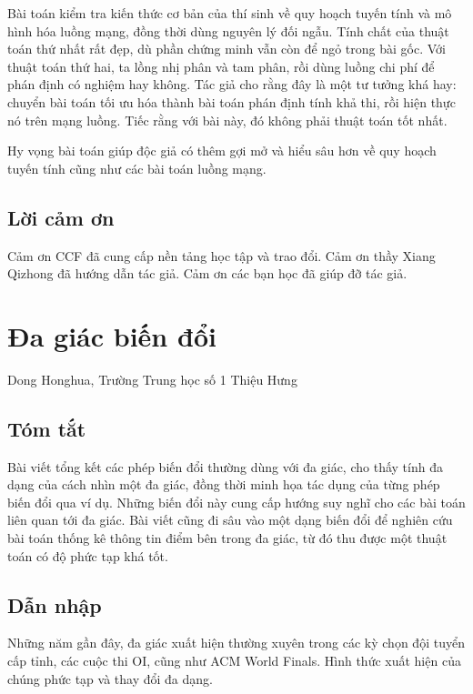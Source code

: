 \documentclass[11pt]{article}
\begin{document}
Bài toán kiểm tra kiến thức cơ bản của thí sinh về quy hoạch tuyến tính và mô
hình hóa luồng mạng, đồng thời dùng nguyên lý đối ngẫu. Tính chất của thuật
toán thứ nhất rất đẹp, dù phần chứng minh vẫn còn để ngỏ trong bài gốc. Với
thuật toán thứ hai, ta lồng nhị phân và tam phân, rồi dùng luồng chi phí để phán
định có nghiệm hay không. Tác giả cho rằng đây là một tư tưởng khá hay: chuyển
bài toán tối ưu hóa thành bài toán phán định tính khả thi, rồi hiện thực nó trên
mạng luồng. Tiếc rằng với bài này, đó không phải thuật toán tốt nhất.

Hy vọng bài toán giúp độc giả có thêm gợi mở và hiểu sâu hơn về quy hoạch tuyến
tính cũng như các bài toán luồng mạng.

\subsection{Lời cảm ơn}

Cảm ơn CCF đã cung cấp nền tảng học tập và trao đổi. Cảm ơn thầy Xiang Qizhong
đã hướng dẫn tác giả. Cảm ơn các bạn học đã giúp đỡ tác giả.

\section{Đa giác biến đổi}

\begin{center}
Dong Honghua, Trường Trung học số 1 Thiệu Hưng
\end{center}

\subsection*{Tóm tắt}

Bài viết tổng kết các phép biến đổi thường dùng với đa giác, cho thấy tính đa
dạng của cách nhìn một đa giác, đồng thời minh họa tác dụng của từng phép biến
đổi qua ví dụ. Những biến đổi này cung cấp hướng suy nghĩ cho các bài toán liên
quan tới đa giác. Bài viết cũng đi sâu vào một dạng biến đổi để nghiên cứu bài
toán thống kê thông tin điểm bên trong đa giác, từ đó thu được một thuật toán
có độ phức tạp khá tốt.

\subsection{Dẫn nhập}

Những năm gần đây, đa giác xuất hiện thường xuyên trong các kỳ chọn đội tuyển
cấp tỉnh, các cuộc thi OI, cũng như ACM World Finals. Hình thức xuất hiện của
chúng phức tạp và thay đổi đa dạng.
\end{document}
